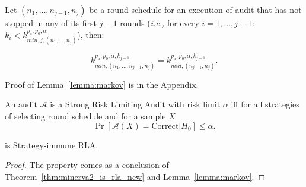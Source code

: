 \begin{lemma}\label{lemma:markov}
Let $(n_1, \ldots, n_{j-1}, n_j)$ be a round schedule for an execution of  \Providence audit that has not stopped
in any of its first $j-1$ rounds (\textit{i.e.,} for every $i = 1, \ldots, j-1$:
$k_i < k^{p_a, p_0, \alpha}_{min, j, (n_1, \ldots, n_j)}$), then: 

\[ 
k^{p_a, p_0, \alpha, k_{j-1}}_{min, (n_1, \ldots, n_{j-1}, n_j)} = k^{p_a, p_0, \alpha, k_{j-1}}_{min, (n_{j-1}, n_j)}.
\]
\end{lemma}
Proof of Lemma~\ref{lemma:markov} is in the Appendix.

\begin{definition}
 An audit $\mathcal{A}$ is a Strong Risk Limiting Audit with risk limit $\alpha$ iff for
 all strategies of selecting round schedule and for a sample $X$ 
 \[
  \Pr\left[\mathcal{A}(X) = \text{Correct} | H_0\right] \leq \alpha.
 \]

\end{definition}

\begin{lemma}
\Providence is Strategy-immune RLA. 
\end{lemma}
\begin{proof}
 The property comes as a conclusion of Theorem~\ref{thm:minerva2_is_rla_new} and Lemma~\ref{lemma:markov}.
\end{proof}







% 
% 

